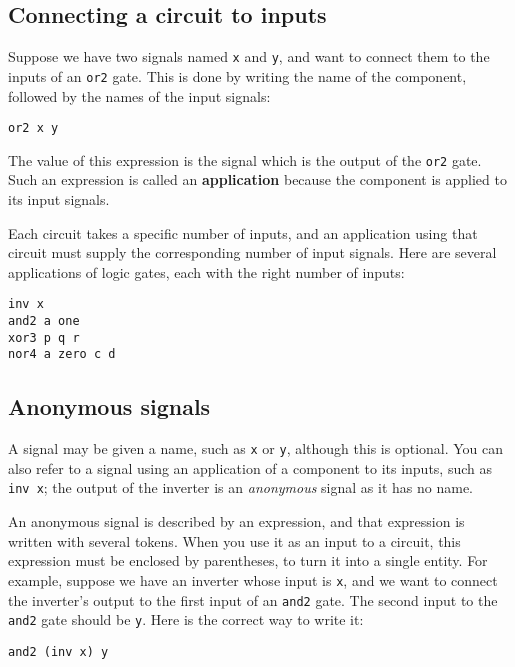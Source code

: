 \documentclass[11pt]{article}
\begin{document}
\subsection{Connecting a circuit to inputs}
\label{sec:orgad9d435}

Suppose we have two signals named \texttt{x} and \texttt{y}, and want to connect
them to the inputs of an \texttt{or2} gate.  This is done by writing the name
of the component, followed by the names of the input signals:

\begin{verbatim}
or2 x y
\end{verbatim}

The value of this expression is the signal which is the output of the
\texttt{or2} gate.  Such an expression is called an \textbf{application} because the
component is applied to its input signals.

Each circuit takes a specific number of inputs, and an application
using that circuit must supply the corresponding number of input
signals.  Here are several applications of logic gates, each with the
right number of inputs:

\begin{verbatim}
inv x
and2 a one
xor3 p q r
nor4 a zero c d
\end{verbatim}

\subsection{Anonymous signals}
\label{sec:org2e37468}

A signal may be given a name, such as \texttt{x} or \texttt{y}, although this is
optional.  You can also refer to a signal using an application of a
component to its inputs, such as \texttt{inv x}; the output of the inverter
is an \emph{anonymous} signal as it has no name.

An anonymous signal is described by an expression, and that expression
is written with several tokens.  When you use it as an input to a
circuit, this expression must be enclosed by parentheses, to turn it
into a single entity.  For example, suppose we have an inverter whose
input is \texttt{x}, and we want to connect the inverter's output to the
first input of an \texttt{and2} gate.  The second input to the \texttt{and2} gate
should be \texttt{y}.  Here is the correct way to write it:

\begin{verbatim}
and2 (inv x) y
\end{verbatim}
\end{document}

